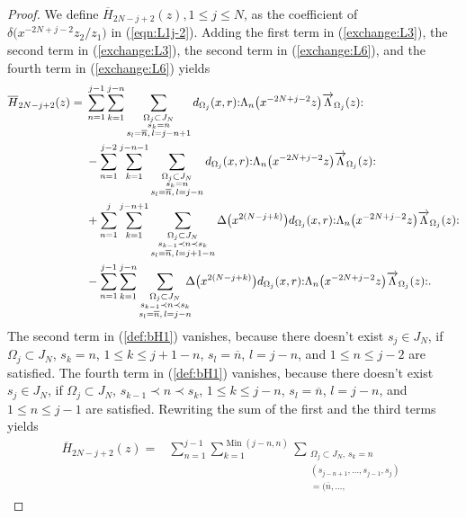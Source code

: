 \documentclass[10pt,a4paper]{amsart}
\numberwithin{equation}{section}
\begin{document}
\begin{proof}
We define $\overline{H}_{2N-j+2}(z), 1\leq j \leq N$, as the coefficient of
$\delta\big(x^{-2N+j-2}z_2/z_1\big)$ in (\ref{eqn:L1j-2}).
Adding the first term in (\ref{exchange:L3}),
the second term in (\ref{exchange:L3}), the second term in (\ref{exchange:L6}),
and the fourth term in (\ref{exchange:L6}) yields
\begin{align}
\overline{H}_{2N-j+2}(z)={}&\sum_{n=1}^{j-1}
\sum_{k=1}^{j-n}\sum\limits_{\substack{\Omega_j \subset J_N\\s_k=n
\\s_l=\overline{n},\, l=j-n+1}}
d_{\Omega_j}(x,r) {:}\Lambda_n\big(x^{-2N+j-2}z\big)\overrightarrow{\Lambda}_{\Omega_j}(z){:}\notag
\\
&-\sum_{n=1}^{j-2}\sum_{k=1}^{j-n-1}
\sum\limits_{\substack{\Omega_j \subset J_N\\s_k=n\\s_l=\overline{n},\, l=j-n}}
d_{\Omega_j}(x,r) {:}\Lambda_n\big(x^{-2N+j-2}z\big)
\overrightarrow{\Lambda}_{\Omega_j}(z){:}\notag
\\
&+\sum_{n=1}^{j}\sum_{k=1}^{j-n+1}\sum\limits_{\substack{\Omega_j \subset J_N
\\s_{k-1}\prec n \prec s_k\\s_l=\overline{n},\, l=j+1-n}}
\Delta\big(x^{2(N-j+k)}\big) d_{\Omega_j}(x,r) {:}\Lambda_n\big(x^{-2N+j-2}z\big)\overrightarrow{\Lambda}_{\Omega_j}(z){:}\notag
\\
&-\sum_{n=1}^{j-1}\sum_{k=1}^{j-n}\sum\limits_{\substack{\Omega_j \subset J_N
\\s_{k-1} \prec n \prec s_k\\s_l=\overline{n},\, l=j-n}}\!\!\!\!
\Delta\big(x^{2(N-j+k)}\big) d_{\Omega_j}(x,r){:}\Lambda_n\big(x^{-2N+j-2}z\big)\overrightarrow{\Lambda}_{\Omega_j}(z){:}.
\label{def:bH1}
\end{align}
The second term in (\ref{def:bH1}) vanishes, because there doesn't exist $s_j \in J_N$,
if $\Omega_j \subset J_N$, $s_k=n$, $1\leq k \leq j+1-n$, $s_l=\overline{n}$, $l=j-n$,
and $1\leq n \leq j-2$ are satisfied. The fourth term in (\ref{def:bH1}) vanishes,
because there doesn't exist $s_j \in J_N$,
if $\Omega_j \subset J_N$, $s_{k-1}\prec n \prec s_k$, $1\leq k \leq j-n$, $s_l=\overline{n}$, $l=j-n$, and $1\leq n \leq j-1$ are satisfied. Rewriting the sum of the first and the third terms yields
\begin{align*}
\overline{H}_{2N-j+2}(z)={}&\sum_{n=1}^{j-1}
\sum_{k=1}^{\operatorname{Min}(j-n, n)}
\sum_{\substack{\Omega_j \subset J_N,\,s_k=n\\(s_{j-n+1}, \dots, s_{j-1}, s_j)\\=(\overline{n}, \dots,
}}
\end{align*}
\end{proof}
\end{document}
